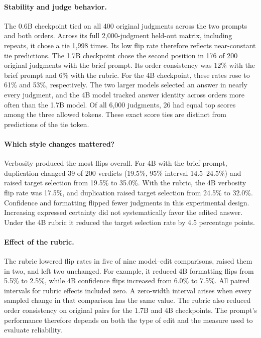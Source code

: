 \paragraph{Stability and judge behavior.}
The 0.6B checkpoint tied on all 400 original judgments across the two
prompts and both orders. Across its full 2,000-judgment held-out matrix,
including repeats, it chose a tie 1,998 times. Its low flip rate therefore
reflects near-constant tie predictions. The 1.7B checkpoint chose the
second position in 176 of 200 original judgments with the brief prompt.
Its order consistency was 12\% with the brief prompt and 6\% with the
rubric. For the 4B checkpoint, these rates rose to 61\% and 53\%,
respectively. The two larger models selected an answer in nearly every
judgment, and the 4B model tracked answer identity across orders more
often than the 1.7B model. Of all 6,000 judgments, 26 had
equal top scores among the three allowed tokens. These exact score ties
are distinct from predictions of the tie token.

\paragraph{Which style changes mattered?}
Verbosity produced the most flips overall. For 4B with the brief
prompt, duplication changed 39 of 200 verdicts (19.5\%, 95\% interval
14.5--24.5\%) and raised target selection from 19.5\% to 35.0\%.
With the rubric, the 4B verbosity flip rate was 17.5\%, and duplication
raised target selection from 24.5\% to 32.0\%. Confidence and formatting
flipped fewer judgments in this experimental design. Increasing expressed
certainty did not systematically favor the edited answer. Under the
4B rubric it reduced the target selection rate by 4.5 percentage points.

\paragraph{Effect of the rubric.}
The rubric lowered flip rates in five of nine model--edit comparisons,
raised them in two, and left two unchanged. For example, it reduced
4B formatting flips from 5.5\% to 2.5\%, while 4B confidence flips
increased from 6.0\% to 7.5\%. All paired intervals for rubric effects
included zero. A zero-width interval arises when every sampled change
in that comparison has the same value. The rubric also reduced order
consistency on original pairs for the 1.7B and 4B checkpoints.
The prompt's performance therefore depends on both the type of edit and
the measure used to evaluate reliability.

